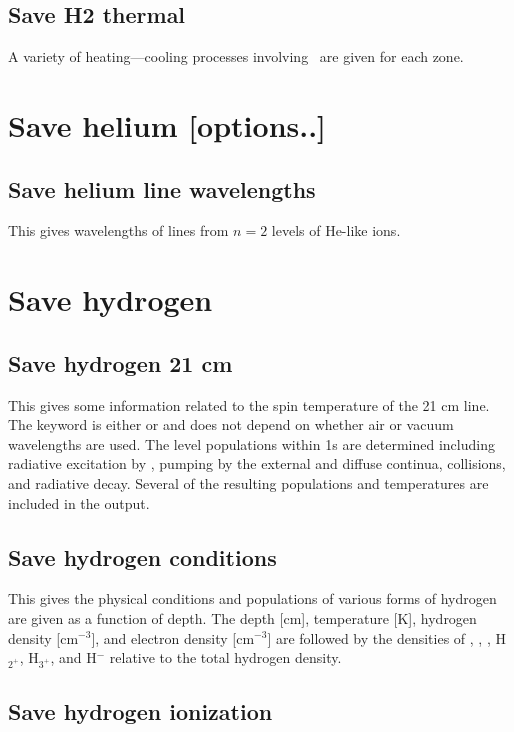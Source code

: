 \subsection{Save H2 thermal}

A variety of heating---cooling processes involving \htwo\ are given
for each zone.

\section{Save helium [options..]}

\subsection{Save helium line wavelengths}

This gives wavelengths of lines from $n=2$ levels of He-like ions.

\section{Save hydrogen}

\subsection{Save hydrogen 21 cm}

This gives some information related to the spin temperature of the 21
cm line.
The keyword is either \cdCommand{21 cm} or \cdCommand{21cm} and does
not depend on whether air or vacuum wavelengths are used.
The level populations
within 1s are determined including radiative excitation by \la, pumping by
the external and diffuse continua, collisions, and radiative decay.  Several
of the resulting populations and temperatures are included in the output.

\subsection{Save hydrogen conditions}

This gives the physical conditions and populations of various forms of
hydrogen are given as a function of depth.  The depth [cm], temperature
[K], hydrogen density [cm$^{-3}$], and electron density [cm$^{-3}$] are followed by
the densities of \hO, \hplus, \htwo, H$_{2^{+}}$, H$_{3^{+}}$, and H$^-$ relative to the total hydrogen
density.

\subsection{Save hydrogen ionization}

